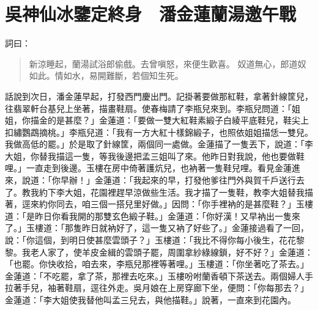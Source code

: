 
\chapter{吳神仙冰鑒定終身　潘金蓮蘭湯邀午戰}

詞曰：
\begin{quote}
新涼睡起，蘭湯試浴郎偷戲。去曾嗔怒，來便生歡喜。
奴道無心，郎道奴如此。情如水，易開難斷，若個知生死。
\end{quote}

話說到次日，潘金蓮早起，打發西門慶出門。記掛著要做那紅鞋，拿著針線筐兒，往翡翠軒台基兒上坐著，描畫鞋扇。使春梅請了李瓶兒來到。李瓶兒問道：「姐姐，你描金的是甚麼？」金蓮道：「要做一雙大紅鞋素緞子白綾平底鞋兒，鞋尖上扣繡鸚鵡摘桃。」李瓶兒道：「我有一方大紅十樣錦緞子，也照依姐姐描恁一雙兒。我做高低的罷。」於是取了針線筐，兩個同一處做。金蓮描了一隻丟下，說道：「李大姐，你替我描這一隻，等我後邊把孟三姐叫了來。他昨日對我說，他也要做鞋哩。」一直走到後邊。玉樓在房中倚著護炕兒，也衲著一隻鞋兒哩。看見金蓮進來，說道：「你早辦！」金蓮道：「我起來的早，打發他爹往門外與賀千戶送行去了。教我約下李大姐，花園裡趕早涼做些生活。我才描了一隻鞋，教李大姐替我描著，逕來約你同去，咱三個一搭兒里好做。」因問：「你手裡衲的是甚麼鞋？」玉樓道：「是昨日你看我開的那雙玄色緞子鞋。」金蓮道：「你好漢！又早衲出一隻來了。」玉樓道：「那隻昨日就衲好了，這一隻又衲了好些了。」金蓮接過看了一回，說：「你這個，到明日使甚麼雲頭子？」玉樓道：「我比不得你每小後生，花花黎黎。我老人家了，使羊皮金緝的雲頭子罷，周圍拿紗綠線鎖，好不好？」金蓮道：「也罷。你快收拾，咱去來，李瓶兒那裡等著哩。」玉樓道：「你坐著吃了茶去。」金蓮道：「不吃罷，拿了茶，那裡去吃來。」玉樓吩咐蘭香頓下茶送去。兩個婦人手拉著手兒，袖著鞋扇，逕往外走。吳月娘在上房穿廊下坐，便問：「你每那去？」金蓮道：「李大姐使我替他叫孟三兒去，與他描鞋。」說著，一直來到花園內。

